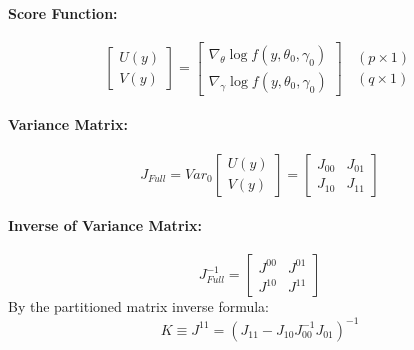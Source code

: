 \documentclass[12pt]{article}
\theoremstyle{definition}
\begin{document}
\paragraph{Score Function:}
	$$\left[\begin{array}{c}
		U(y)\\
		V(y)
\end{array} \right] = \left[\begin{array}{c}
		\nabla_\theta \log{f(y, \theta_0, \gamma_0)}\\
		\nabla_\gamma \log{f(y, \theta_0, \gamma_0)}
\end{array}\right]\;\;\begin{array}{c}
		(p\times 1)\\
		(q\times 1)
\end{array}$$

\paragraph{Variance Matrix:}
	$$J_{Full} = Var_0\left[\begin{array}{c}
		U(y)\\
		V(y)
\end{array}\right]=\left[\begin{array}{cc}
		J_{00} & J_{01}\\
		J_{10} & J_{11}
	\end{array}\right]
$$
\paragraph{Inverse of Variance Matrix:}
	$$
	J_{Full}^{-1} = \left[\begin{array}{cc}
		J^{00} & J^{01}\\
		J^{10} & J^{11}
	\end{array}\right]
$$
By the partitioned matrix inverse formula:
	$$
	K \equiv J^{11} = (J_{11} - J_{10}J_{00}^{-1}J_{01})^{-1}
$$
\end{document}
